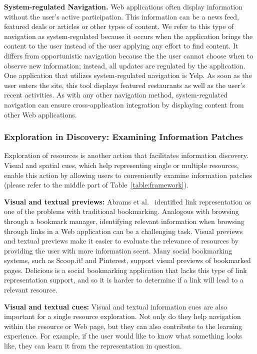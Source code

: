 \documentclass{sigchi}
\newcommand{\feature}[1]{{\ttfamily#1}}
\begin{document}
{\textbf{System-regulated Navigation.}
Web applications often display information without the user's active participation. This information can be a \feature{news feed}, \feature{featured} deals or articles or other types of content. We refer to this type of navigation as system-regulated because it occurs when the application brings the content to the user instead of the user applying any effort to find content. It differs from opportunistic navigation because the the user cannot choose when to observe new information; instead, all updates are regulated by the application. 
%
One application that utilizes system-regulated navigation is Yelp. As soon as the user enters the site, this tool displays featured restaurants as well as the user's recent activities. As with any other navigation method, system-regulated navigation can ensure cross-application \feature{integration} by displaying content from other Web applications. 


{\subsubsection{Exploration in Discovery: Examining Information Patches}
Exploration of resources is another action that facilitates information discovery. Visual and spatial cues, which help representing single or multiple resources, enable this action by allowing users to conveniently examine information patches (please refer to the middle part of Table~\ref{table:framework}). 

\textbf{Visual and textual previews:} Abrams et al.~\cite{abrams1998information} identified link representation as one of the problems with traditional bookmarking. Analogous with browsing through a bookmark manager, identifying relevant information when browsing through links in a Web application can be a challenging task. \feature{Visual previews} and \feature{textual previews} make it easier to evaluate the relevance of resources by providing the user with more information scent. Many social bookmarking systems, such as Scoop.it! and Pinterest, support visual previews of bookmarked pages. Delicious is a social bookmarking application that lacks this type of link representation support, and so it is harder to determine if a link will lead to a relevant resource.

\textbf{Visual and textual cues:} \feature{Visual and textual information cues} are also important for a single resource exploration. Not only do they help navigation within the resource or Web page, but they can also contribute to the learning experience. For example, if the user would like to know what something looks like, they can learn it from the representation in question.  

}}
\end{document}
